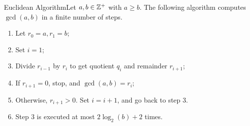 



\begin{theorem}
    {Euclidean Algorithm}Let \(a,b \in \mathbb{Z}^+\) with \(a \geq b\). The following algorithm computes \(\gcd(a,b)\) in a finite number of steps. \begin{enumerate}
        \item Let \(r_0 = a, r_1 = b\);
        \item Set \(i = 1\);
        \item Divide \(r_{i - 1}\) by \(r_i\) to get quotient \(q_i\) and remainder \(r_{i + 1}\);
        \item If \(r_{i + 1} = 0\), stop, and \(\gcd(a,b) = r_i\);
        \item Otherwise, \(r_{i + 1} > 0\). Set \(i = i + 1\), and go back to step 3.
        \item Step 3 is executed at most \(2\log_2(b) + 2\) times.
    \end{enumerate}
\end{theorem}

